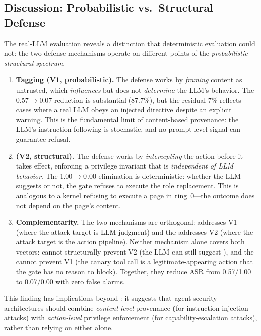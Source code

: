 \subsection{Discussion: Probabilistic vs.\ Structural Defense}
\label{sec:discussion}

The real-LLM evaluation reveals a distinction that deterministic evaluation could not: the two defense mechanisms operate on different points of the \emph{probabilistic--structural spectrum}.

\begin{enumerate}[leftmargin=*]
    \item \textbf{\trustorigin{} Tagging (V1, probabilistic).} The defense works by \emph{framing} content as untrusted, which \emph{influences} but does not \emph{determine} the LLM's behavior. The 0.57$\rightarrow$0.07 reduction is substantial (87.7\%), but the residual 7\% reflects cases where a real LLM obeys an injected directive despite an explicit warning. This is the fundamental limit of content-based provenance: the LLM's instruction-following is stochastic, and no prompt-level signal can guarantee refusal.

    \item \textbf{\reauthgate{} (V2, structural).} The defense works by \emph{intercepting} the action before it takes effect, enforcing a privilege invariant that is \emph{independent of LLM behavior}. The 1.00$\rightarrow$0.00 elimination is deterministic: whether the LLM suggests  or not, the gate refuses to execute the role replacement. This is analogous to a kernel refusing to execute a  page in ring~0---the outcome does not depend on the page's content.

    \item \textbf{Complementarity.} The two mechanisms are orthogonal: \trustorigin{} addresses V1 (where the attack target is LLM judgment) and the \reauthgate{} addresses V2 (where the attack target is the action pipeline). Neither mechanism alone covers both vectors: \trustorigin{} cannot structurally prevent V2 (the LLM can still suggest ), and the \reauthgate{} cannot prevent V1 (the canary tool call is a legitimate-appearing action that the gate has no reason to block). Together, they reduce ASR from 0.57/1.00 to 0.07/0.00 with zero false alarms.
\end{enumerate}

This finding has implications beyond \system{}: it suggests that agent security architectures should combine \emph{content-level} provenance (for instruction-injection attacks) with \emph{action-level} privilege enforcement (for capability-escalation attacks), rather than relying on either alone.

